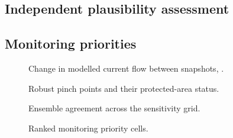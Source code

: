 \subsection{Independent plausibility assessment}

\subsection{Monitoring priorities}

\begin{figure}[htbp]\centering
  \caption{Change in modelled current flow between snapshots, \studyperiod.
  }
  \label{fig:change}
\end{figure}

\begin{figure}[htbp]\centering
  \caption{Robust pinch points and their protected-area status.}\label{fig:pinch}
\end{figure}

\begin{figure}[htbp]\centering
  \caption{Ensemble agreement across the sensitivity grid.}\label{fig:agreement}
\end{figure}

\begin{figure}[htbp]\centering
  \caption{Ranked monitoring priority cells.}\label{fig:priority}
\end{figure}

\begin{table}[htbp]\centering
  \caption{Covariates, native resolution, source years, and static/dynamic treatment.}
  \label{tab:covariates}
\end{table}

\begin{table}[htbp]\centering
  \caption{Top 20 robust pinch points with country, protection status, and agreement score.}
  \label{tab:top20}
\end{table}

\begin{table}[htbp]\centering
  \caption{Protected-area coverage of high-current area against the predeclared null.}
  \label{tab:pa}
\end{table}

\begin{table}[htbp]\centering
  \caption{Monitoring priority ranking with component scores under alternative weightings.}
  \label{tab:priority}
\end{table}
